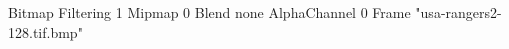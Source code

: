 {Bitmap
	{Filtering 1}
	{Mipmap 0}
	{Blend none}
	{AlphaChannel 0}
	{Frame "usa-rangers2-128.tif.bmp"}
}

